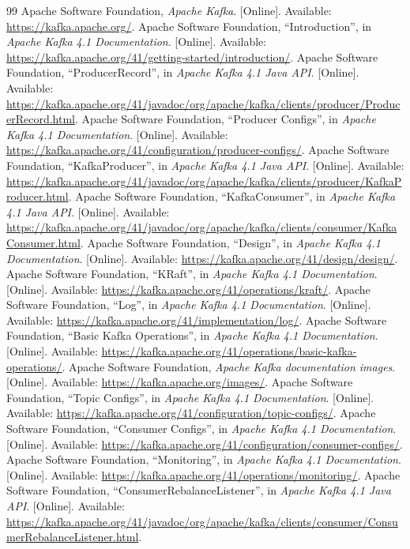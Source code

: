 \begin{thebibliography}{99}
 Apache Software Foundation, \emph{Apache Kafka}. [Online]. Available: \url{https://kafka.apache.org/}.
 Apache Software Foundation, ``Introduction'', in \emph{Apache Kafka 4.1 Documentation}. [Online]. Available: \url{https://kafka.apache.org/41/getting-started/introduction/}.
 Apache Software Foundation, ``ProducerRecord'', in \emph{Apache Kafka 4.1 Java API}. [Online]. Available: \url{https://kafka.apache.org/41/javadoc/org/apache/kafka/clients/producer/ProducerRecord.html}.
 Apache Software Foundation, ``Producer Configs'', in \emph{Apache Kafka 4.1 Documentation}. [Online]. Available: \url{https://kafka.apache.org/41/configuration/producer-configs/}.
 Apache Software Foundation, ``KafkaProducer'', in \emph{Apache Kafka 4.1 Java API}. [Online]. Available: \url{https://kafka.apache.org/41/javadoc/org/apache/kafka/clients/producer/KafkaProducer.html}.
 Apache Software Foundation, ``KafkaConsumer'', in \emph{Apache Kafka 4.1 Java API}. [Online]. Available: \url{https://kafka.apache.org/41/javadoc/org/apache/kafka/clients/consumer/KafkaConsumer.html}.
 Apache Software Foundation, ``Design'', in \emph{Apache Kafka 4.1 Documentation}. [Online]. Available: \url{https://kafka.apache.org/41/design/design/}.
 Apache Software Foundation, ``KRaft'', in \emph{Apache Kafka 4.1 Documentation}. [Online]. Available: \url{https://kafka.apache.org/41/operations/kraft/}.
 Apache Software Foundation, ``Log'', in \emph{Apache Kafka 4.1 Documentation}. [Online]. Available: \url{https://kafka.apache.org/41/implementation/log/}.
 Apache Software Foundation, ``Basic Kafka Operations'', in \emph{Apache Kafka 4.1 Documentation}. [Online]. Available: \url{https://kafka.apache.org/41/operations/basic-kafka-operations/}.
 Apache Software Foundation, \emph{Apache Kafka documentation images}. [Online]. Available: \url{https://kafka.apache.org/images/}.
 Apache Software Foundation, ``Topic Configs'', in \emph{Apache Kafka 4.1 Documentation}. [Online]. Available: \url{https://kafka.apache.org/41/configuration/topic-configs/}.
 Apache Software Foundation, ``Consumer Configs'', in \emph{Apache Kafka 4.1 Documentation}. [Online]. Available: \url{https://kafka.apache.org/41/configuration/consumer-configs/}.
 Apache Software Foundation, ``Monitoring'', in \emph{Apache Kafka 4.1 Documentation}. [Online]. Available: \url{https://kafka.apache.org/41/operations/monitoring/}.
 Apache Software Foundation, ``ConsumerRebalanceListener'', in \emph{Apache Kafka 4.1 Java API}. [Online]. Available: \url{https://kafka.apache.org/41/javadoc/org/apache/kafka/clients/consumer/ConsumerRebalanceListener.html}.
\end{thebibliography}
\endgroup
